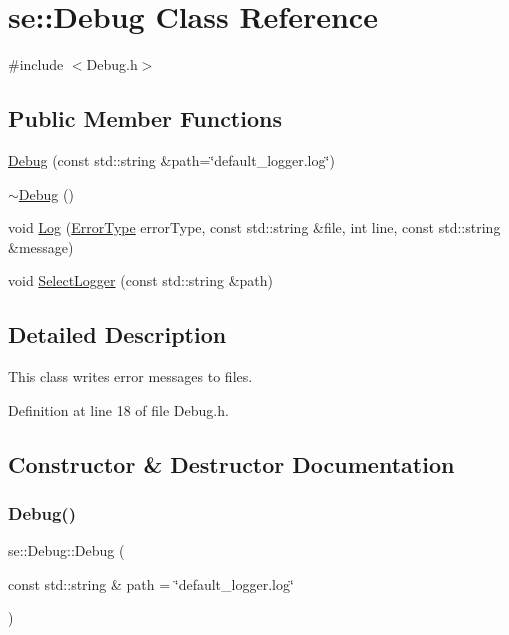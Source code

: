 \hypertarget{classse_1_1_debug}{}\section{se\+:\+:Debug Class Reference}
\label{classse_1_1_debug}


{\ttfamily \#include $<$Debug.\+h$>$}

\subsection*{Public Member Functions}
\begin{DoxyCompactItemize}
\item 
\mbox{\hyperlink{classse_1_1_debug_a1292de4f720caa545023e0b4a4735eef}{Debug}} (const std\+::string \&path=\char`\"{}default\+\_\+logger.\+log\char`\"{})
\item 
\mbox{\hyperlink{classse_1_1_debug_a2ff6371c83b2a8918b15907bd1491ac9}{$\sim$\+Debug}} ()
\item 
void \mbox{\hyperlink{classse_1_1_debug_a3ebaea1144b70d56762d2b1054c8251d}{Log}} (\mbox{\hyperlink{namespacese_aaa5cbe4d4821d8a349338e23de6ef9c4}{Error\+Type}} error\+Type, const std\+::string \&file, int line, const std\+::string \&message)
\item 
void \mbox{\hyperlink{classse_1_1_debug_ab97d44dca8606c2be2cb709f7e82be09}{Select\+Logger}} (const std\+::string \&path)
\end{DoxyCompactItemize}


\subsection{Detailed Description}
This class writes error messages to files. 

Definition at line 18 of file Debug.\+h.



\subsection{Constructor \& Destructor Documentation}
\mbox{\label{classse_1_1_debug_a1292de4f720caa545023e0b4a4735eef}} 
\subsubsection{\texorpdfstring{Debug()}{Debug()}}
{\footnotesize\ttfamily se\+::\+Debug\+::\+Debug (\begin{DoxyParamCaption}\item[{const std\+::string \&}]{path = {\ttfamily \char`\"{}default\+\_\+logger.log\char`\"{}} }\end{DoxyParamCaption})}

